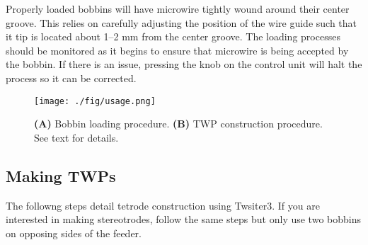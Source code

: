 \documentclass[11pt,a4paper]{article}
\begin{document}
Properly loaded bobbins will have microwire tightly wound around their center
groove. This relies on carefully adjusting the position of the wire guide such
that it tip is located about 1--2 mm from the center groove. The loading
processes should be monitored as it begins to ensure that microwire is being
accepted by the bobbin. If there is an issue, pressing the knob on the
control unit will halt the process so it can be corrected.

\begin{figure}
\centering
\texttt{[image: ./fig/usage.png]}
\caption{\textbf{(A)} Bobbin loading procedure. \textbf{(B)} TWP construction
procedure. See text for details.}
\label{f:usage}
\end{figure}

\subsection{Making TWPs}
The followng steps detail tetrode construction using Twsiter3. If you are
interested in making stereotrodes, follow the same steps but only use two
bobbins on opposing sides of the feeder.
\end{document}

